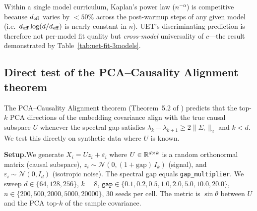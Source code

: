 \begin{remark}
Within a single model curriculum, Kaplan's power law ($n^{-\alpha}$) is competitive
because $d_{\mathrm{eff}}$ varies by $< 50\%$ across the post-warmup steps of any given model
(i.e.\ $d_{\mathrm{eff}}\log(d/d_{\mathrm{eff}})$ is nearly constant in $n$).  UET's discriminating
prediction is therefore not per-model fit quality but \emph{cross-model} universality
of $c$---the result demonstrated by Table~\ref{tab:uet-fit-3models}.
\end{remark}

\subsection{Direct test of the PCA--Causality Alignment theorem}
\label{sec:pca-direct}

The PCA--Causality Alignment theorem (Theorem~5.2 of \citealt{uet2026}) predicts
that the top-$k$ PCA directions of the embedding covariance align with the true
causal subspace $U$ whenever the spectral gap satisfies
$\lambda_k - \lambda_{k+1} \geq 2\|\Sigma_\epsilon\|_2$ and $k < d$.
We test this directly on synthetic data where $U$ is known.

\textbf{Setup.}\quad We generate $X_i = U z_i + \varepsilon_i$ where
$U \in \mathbb{R}^{d \times k}$ is a random orthonormal matrix (causal subspace),
$z_i \sim \mathcal{N}(0, (1+\mathrm{gap})\,I_k)$ (signal), and
$\varepsilon_i \sim \mathcal{N}(0, I_d)$ (isotropic noise).
The spectral gap equals \texttt{gap\_multiplier}.
We sweep $d \in \{64, 128, 256\}$, $k = 8$,
$\texttt{gap} \in \{0.1, 0.2, 0.5, 1.0, 2.0, 5.0, 10.0, 20.0\}$,
$n \in \{200, 500, 2000, 5000, 20000\}$, 30 seeds per cell.
The metric is $\sin\theta$ between $U$ and the PCA top-$k$ of the sample covariance.

